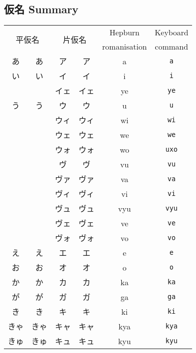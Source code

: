 \documentclass[../nihongo-gakushuu-kyouzai.tex]{subfiles}
\begin{document}
\subsection{仮名 Summary}
\begin{longtable}[c]{@{}cccccc@{}}
    \toprule
    \multicolumn{2}{c}{\multirow{2}{*}{平仮名}} & \multicolumn{2}{c}{\multirow{2}{*}{片仮名}} & Hepburn & Keyboard \\
    \multicolumn{2}{c}{} & \multicolumn{2}{c}{} & romanisation & command \\* \midrule
    あ & {\sffamily あ} & ア & {\sffamily ア} & a & \texttt{a} \\
    い & {\sffamily い} & イ & {\sffamily イ} & i & \texttt{i}\\
 & {\sffamily } & イェ & {\sffamily イェ} & ye & \texttt{ye} \\
    う & {\sffamily う} & ウ & {\sffamily ウ} & u & \texttt{u} \\
 & {\sffamily } & ウィ & {\sffamily ウィ} & wi & \texttt{wi} \\
 & {\sffamily } & ウェ & {\sffamily ウェ} & we & \texttt{we} \\
 & {\sffamily } & ウォ & {\sffamily ウォ} & wo & \color{red} \texttt{uxo} \\
 & {\sffamily } & ヴ & {\sffamily ヴ} & vu & \texttt{vu} \\
 & {\sffamily } & ヴァ & {\sffamily ヴァ} & va & \texttt{va} \\
 & {\sffamily } & ヴィ & {\sffamily ヴィ} & vi & \texttt{vi} \\
 & {\sffamily } & ヴュ & {\sffamily ヴュ} & vyu & \texttt{vyu} \\
 & {\sffamily } & ヴェ & {\sffamily ヴェ} & ve & \texttt{ve} \\
 & {\sffamily } & ヴォ & {\sffamily ヴォ} & vo & \texttt{vo} \\
    え & {\sffamily え} & エ & {\sffamily エ} & e & \texttt{e} \\
    お & {\sffamily お} & オ & {\sffamily オ} & o & \texttt{o} \\
    か & {\sffamily か} & カ & {\sffamily カ} & ka & \texttt{ka} \\
    が & {\sffamily が} & ガ & {\sffamily ガ} & ga & \texttt{ga} \\
    き & {\sffamily き} & キ & {\sffamily キ} & ki & \texttt{ki} \\
    きゃ & {\sffamily きゃ} & キャ & {\sffamily キャ} & kya & \texttt{kya} \\
    きゅ & {\sffamily きゅ} & キュ & {\sffamily キュ} & kyu & \texttt{kyu} \\

\end{longtable}
\end{document}
